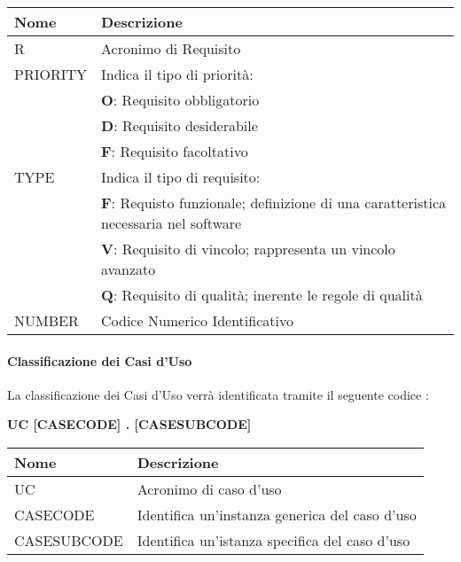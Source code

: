 \renewcommand{\arraystretch}{1.8} %
\begin{tabular}{ |m{7em}|m{30em}| }
  \hline
  \textbf{Nome} & \textbf{Descrizione} \\
  \hline
  R & Acronimo di Requisito \\
  \hline
  PRIORITY & Indica il tipo di priorità: \\
        &	\textbf{O}: Requisito obbligatorio \\
        &	\textbf{D}: Requisito desiderabile \\
        &	\textbf{F}: Requisito facoltativo  \\
  \hline 	 
  TYPE & Indica il tipo di requisito: \\
        & \textbf{F}: Requisto funzionale; definizione di una 	caratteristica necessaria nel software \\
        &	\textbf{V}: Requisito di vincolo; rappresenta un vincolo avanzato \\
        &	\textbf{Q}: Requisito di qualità; inerente le regole di qualità \\
  \hline
  NUMBER & Codice Numerico Identificativo \\
  \hline
\end{tabular}
  
\paragraph{Classificazione dei Casi d'Uso} \hfill \break
La classificazione dei Casi d'Uso verrà identificata tramite il seguente codice : 
\begin{center}
  \textbf{UC [CASECODE] . [CASESUBCODE]}
\end{center}
  
\begin{tabular}{ |m{10em}|m{27em}| }
  \hline
  \textbf{Nome} & \textbf{Descrizione} \\
  \hline
  UC & Acronimo di caso d'uso \\
  \hline
  CASECODE & Identifica un'instanza generica del caso d'uso  \\
  \hline
  CASESUBCODE & Identifica un'istanza specifica del caso d'uso \\
  \hline
\end{tabular}
  
